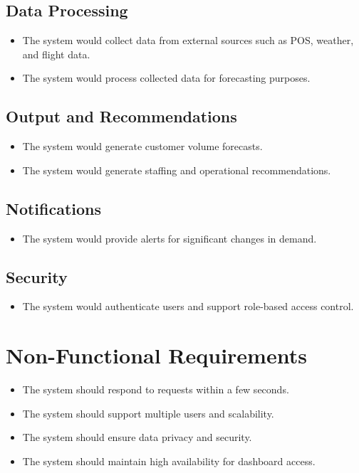 \documentclass[12pt]{report}
\begin{document}
\subsection{Data Processing}
\begin{itemize}
    \item The system would collect data from external sources such as POS, weather, and flight data.
    \item The system would process collected data for forecasting purposes.
\end{itemize}

\subsection{Output and Recommendations}
\begin{itemize}
    \item The system would generate customer volume forecasts.
    \item The system would generate staffing and operational recommendations.
\end{itemize}

\subsection{Notifications}
\begin{itemize}
    \item The system would provide alerts for significant changes in demand.
\end{itemize}

\subsection{Security}
\begin{itemize}
    \item The system would authenticate users and support role-based access control.
\end{itemize}

\section{Non-Functional Requirements}
\begin{itemize}
    \item The system should respond to requests within a few seconds.
    \item The system should support multiple users and scalability.
    \item The system should ensure data privacy and security.
    \item The system should maintain high availability for dashboard access.
\end{itemize}
\end{document}
